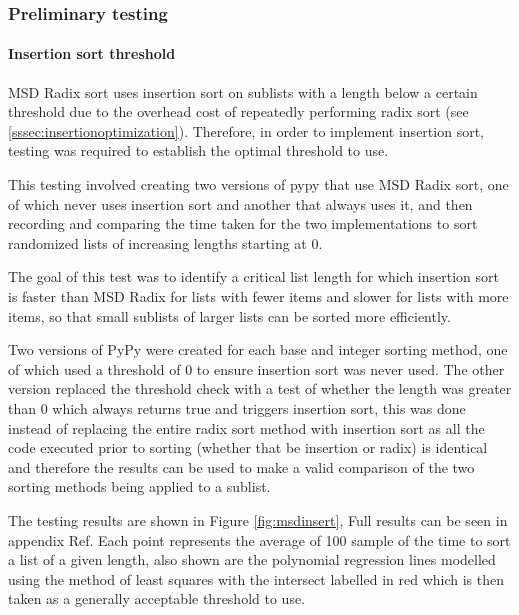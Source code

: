\documentclass[12pt]{article}
\begin{document}
\subsubsection{Preliminary testing}
\paragraph{Insertion sort threshold}
\label{sssec:insertiontesting}
MSD Radix sort uses insertion sort on sublists with a length below a certain threshold due to the overhead cost of repeatedly performing radix sort (see \ref{sssec:insertionoptimization}). Therefore, in order to implement insertion sort, testing was required to establish the optimal threshold to use.
\par
This testing involved creating two versions of pypy that use MSD Radix sort, one of which never uses insertion sort and another that always uses it, and then recording and comparing the time taken for the two implementations to sort randomized lists of increasing lengths starting at 0. 
\par
The goal of this test was to identify a critical list length for which insertion sort is faster than MSD Radix for lists with fewer items and slower for lists with more items, so that small sublists of larger lists can be sorted more efficiently.
\par
Two versions of PyPy were created for each base and integer sorting method, one of which used a threshold of $0$ to ensure insertion sort was never used. The other version replaced the threshold check with a test of whether the length was greater than 0 which always returns true and triggers insertion sort, this was done instead of replacing the entire radix sort method with insertion sort as all the code executed prior to sorting (whether that be insertion or radix) is identical and therefore the results can be used to make a valid comparison of the two sorting methods being applied to a sublist.
\par
The testing results are shown in Figure \ref{fig:msdinsert}, Full results can be seen in appendix {\color{red} Ref}. Each point represents the average of 100 sample of the time to sort a list of a given length, also shown are the polynomial regression lines modelled using the method of least squares with the intersect labelled in red which is then taken as a generally acceptable threshold to use.
\begin{table}[h]
	\begin{minipage}{\textwidth}
		\centering
		
		\label{fig:msdinsert}
	\end{minipage}
	
\end{table}
\pagebreak
\end{document}
